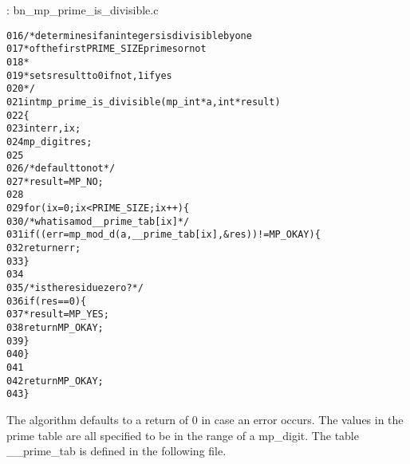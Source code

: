 \documentclass[b5paper]{book}
\begin{document}
\vspace{+3mm}\begin{small}
\hspace{-5.1mm}{\bf File}: bn\_mp\_prime\_is\_divisible.c
\vspace{-3mm}
\begin{alltt}
016   /* determines if an integers is divisible by one 
017    * of the first PRIME_SIZE primes or not
018    *
019    * sets result to 0 if not, 1 if yes
020    */
021   int mp_prime_is_divisible (mp_int * a, int *result)
022   \{
023     int     err, ix;
024     mp_digit res;
025   
026     /* default to not */
027     *result = MP_NO;
028   
029     for (ix = 0; ix < PRIME_SIZE; ix++) \{
030       /* what is a mod __prime_tab[ix] */
031       if ((err = mp_mod_d (a, __prime_tab[ix], &res)) != MP_OKAY) \{
032         return err;
033       \}
034   
035       /* is the residue zero? */
036       if (res == 0) \{
037         *result = MP_YES;
038         return MP_OKAY;
039       \}
040     \}
041   
042     return MP_OKAY;
043   \}
\end{alltt}
\end{small}

The algorithm defaults to a return of $0$ in case an error occurs.  The values in the prime table are all specified to be in the range of a 
mp\_digit.  The table \_\_prime\_tab is defined in the following file.
\end{document}
